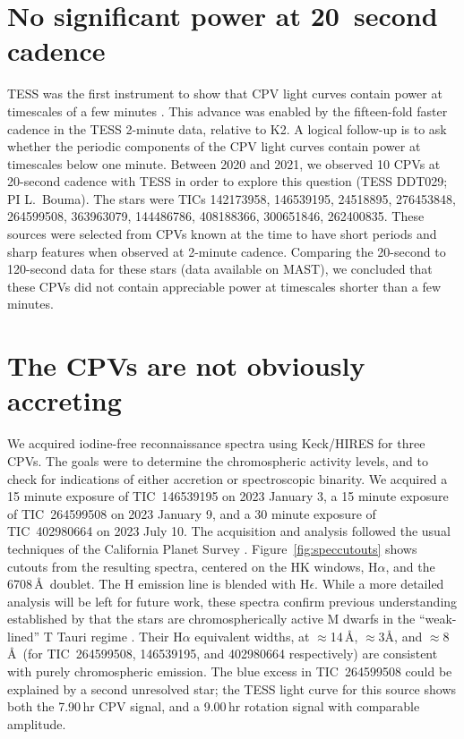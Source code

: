 \documentclass[11pt,twocolumn,tighten]{aastex63}
\begin{document}
\section{No significant power at 20~second cadence}
\label{sec:twentysec}

TESS was the first instrument to show that CPV light curves contain
power at timescales of a few minutes
\citep{2019ApJ...876..127Z,2022AJ....163..144G}.  This advance was
enabled by the fifteen-fold faster cadence in the TESS 2-minute data,
relative to K2.  A logical follow-up is to ask whether the periodic
components of the CPV light curves contain power at timescales below
one minute.  Between 2020 and 2021, we observed 10 CPVs at 20-second
cadence with TESS in order to explore this question (TESS DDT029; PI L.~Bouma).
The stars were TICs 142173958, 146539195, 24518895, 276453848,
264599508, 363963079, 144486786, 408188366, 300651846, 262400835.
These sources were selected from CPVs known at the time to have short
periods and sharp features when observed at 2-minute cadence.
Comparing the 20-second to 120-second data for these stars (data
available on MAST), we concluded that these CPVs did not contain
appreciable power at timescales shorter than a few minutes.


\section{The CPVs are not obviously accreting}
\label{sec:accretion}

We acquired iodine-free reconnaissance spectra using Keck/HIRES for
three CPVs.  The goals were to determine the chromospheric activity
levels, and to check for indications of either accretion or
spectroscopic binarity.  We acquired a 15 minute exposure of
TIC~146539195 on 2023 January 3, a 15 minute exposure of TIC~264599508
on 2023 January 9, and a 30 minute exposure of TIC~402980664 on 2023
July 10.  The acquisition and analysis followed the usual techniques
of the California Planet Survey \citep{2010ApJ...721.1467H}.
Figure~\ref{fig:speccutouts} shows cutouts from the resulting spectra,
centered on the  HK windows, H$\alpha$, and the 
6708\,\AA\ doublet.  The  H emission line is blended with
H$\epsilon$.  While a more detailed analysis will be left for future
work, these spectra confirm previous understanding established by
\citet{2017AJ....153..152S} that the stars are chromospherically
active M dwarfs in the ``weak-lined'' T Tauri regime
\citep[e.g.][Figure~15]{2019AJ....157...85B}.  Their H$\alpha$
equivalent widths, at $\approx$14\,\AA, $\approx$3\AA, and
$\approx$8\,\AA\ (for TIC~264599508, 146539195, and 402980664
respectively) are consistent with purely chromospheric emission.  The
blue excess in TIC~264599508 could be explained by a second unresolved
star; the TESS light curve for this source shows both the 7.90\,hr CPV
signal, and a 9.00\,hr rotation signal with comparable amplitude.
\end{document}
